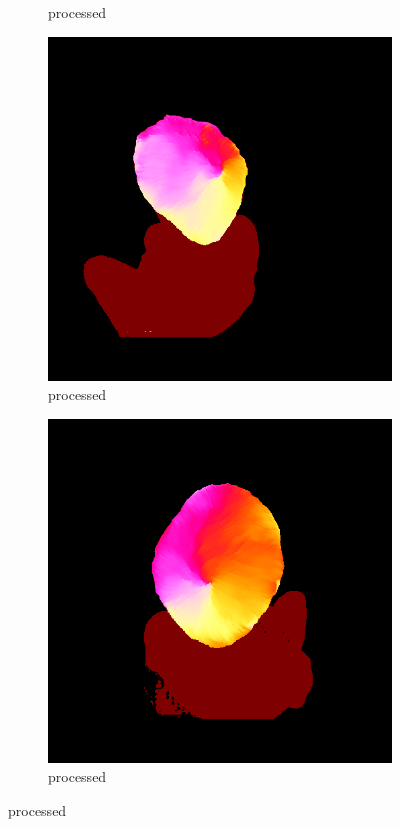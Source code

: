 \documentclass[12pt]{article}
\begin{document}
\begin{figure}[h]
\begin{subfigure}{0.2\textwidth}
            \caption{processed}
        \end{subfigure}
        \hfill
        \begin{subfigure}{0.2\textwidth}
            \centering
            \includegraphics[width=\textwidth]{project-milestone/images/strand_map/IMG_0346.png}
            \caption{processed}
        \end{subfigure}
        \hfill
        \begin{subfigure}{0.2\textwidth}
            \centering
            \includegraphics[width=\textwidth]{project-milestone/images/strand_map/IMG_0349.png}
            \caption{processed}
        \end{subfigure}
        

\end{figure}
\end{document}
